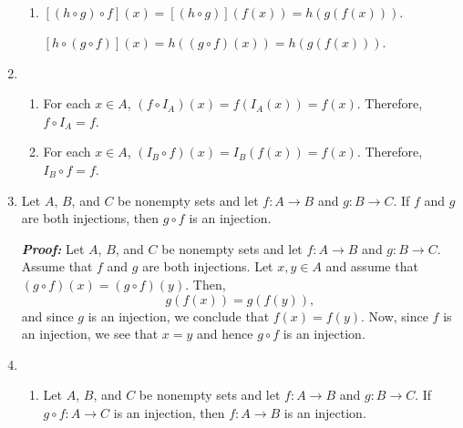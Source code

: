 \begin{enumerate}
\begin{enumerate}
\item 
$\left[ {\left( {h \circ g} \right) \circ f} \right]\left( x \right) 
  = \left[ \left( {h \circ g} \right) \right] \left( f \left( x \right) \right)
  = h \left( g \left( f \left( x \right) \right) \right).$

$\left[ {h \circ \left( {g \circ f} \right)} \right]\left( x \right) 
  = h \left( \left( g \circ f \right) \left( x \right) \right) 
  = h \left( g \left( f \left( x \right) \right) \right)$. 
\end{enumerate}

\item \begin{enumerate}
\item For each  $x \in A$, $\left( {f \circ I_A } \right)\left( x \right) = f\left( {I_A \left( x \right)} \right) = f\left( x \right)$.  Therefore, $f \circ I_A  = f$.

\item For each  $x \in A$, $\left( {I_B \circ f } \right)\left( x \right) = I_B \left( {f \left( x \right)} \right) = f\left( x \right)$.  Therefore, $I_B \circ f  = f$.
\end{enumerate}



\item Let  $A$, $B$, and  $C$  be nonempty sets and let  $f:A \to B$  and  $g:B \to C$.  If  $f$  and  $g$  are both injections, then  $g \circ f$  is an injection. 

\textbf{\emph{Proof:}} Let  $A$, $B$, and  $C$  be nonempty sets and let  $f:A \to B$  and  
$g:B \to C$.  Assume that $f$  and  $g$  are both injections.  Let  $x, y \in A$ and assume that  
$\left( {g \circ f} \right)\left( x \right) = \left( {g \circ f} \right)\left( y \right)$.  Then,
\[
g \left( f \left( x \right) \right) = g \left( f \left( y \right) \right),
\] 
and since $g$ is an injection, we conclude that $f \left( x \right) = f \left( y \right)$.  Now, since $f$ is an injection, we see that $x = y$ and hence $g \circ f$ is an injection.



\item \begin{enumerate}
\item Let  $A$, $B$, and  $C$  be nonempty sets and let  $f:A \to B$  and  $g:B \to C$.  If  
$g \circ f:A \to C$  is an injection, then  $f:A \to B$  is an injection.


\end{enumerate}
\end{enumerate}
